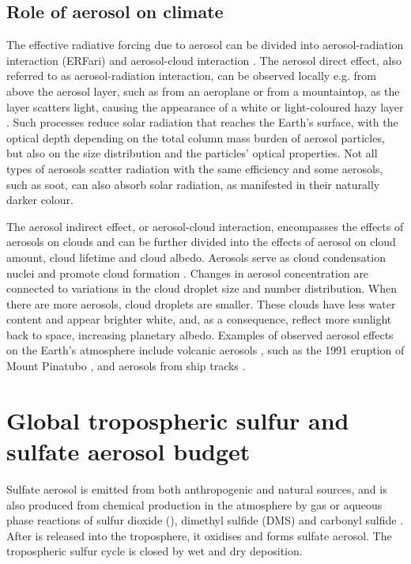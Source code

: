 \subsection{Role of aerosol on climate}

The effective radiative forcing due to aerosol can be divided into aerosol-radiation interaction (ERFari) and aerosol-cloud interaction \citep[ERFaci;][]{ghanTechnicalNoteEstimating2013}. The aerosol direct effect, also referred to as aerosol-radiation interaction, can be observed locally e.g. from above the aerosol layer, such as from an aeroplane or from a mountaintop, as the layer scatters light, causing the appearance of a white or light-coloured hazy layer \citep{twomeyInfluencePollutionShortwave1977}. Such processes reduce solar radiation that reaches the Earth’s surface, with the optical depth depending on the total column mass burden of aerosol particles, but also on the size distribution and the particles’ optical properties. Not all types of aerosols scatter radiation with the same efficiency and some aerosols, such as soot, can also absorb solar radiation, as manifested in their naturally darker colour. 

The aerosol indirect effect, or aerosol-cloud interaction, encompasses the effects of aerosols on clouds and can be further divided into the effects of aerosol on cloud amount, cloud lifetime and cloud albedo.  Aerosols serve as cloud condensation nuclei and promote cloud formation \citep{albrechtAerosolsCloudMicrophysics1989}.  Changes in aerosol concentration are connected to variations in the cloud droplet size and number distribution. When there are more aerosols, cloud droplets are smaller. These clouds have less water content and appear brighter white, and, as a consequence, reflect more sunlight back to space, increasing planetary albedo. Examples of observed aerosol effects on the Earth’s atmosphere include volcanic aerosols \citep[e.g.][]{malavelleStrongConstraintsAerosol2017}, such as the 1991 eruption of Mount Pinatubo \citep{hansenPotentialClimateImpact1992}, and aerosols from ship tracks \citep{twohyEvaluationAerosolIndirect2005}. 


\section{Global tropospheric sulfur and sulfate aerosol budget}

Sulfate aerosol is emitted from both anthropogenic and natural sources, and is also produced from chemical production in the atmosphere by gas or aqueous phase reactions of sulfur dioxide (), dimethyl sulfide (DMS) and carbonyl sulfide \citep[OCS;][]{belvisoAssessmentMarineBiota2000}. After  is released into the troposphere, it oxidises and forms sulfate aerosol.  The tropospheric sulfur cycle is closed by wet and dry deposition.

